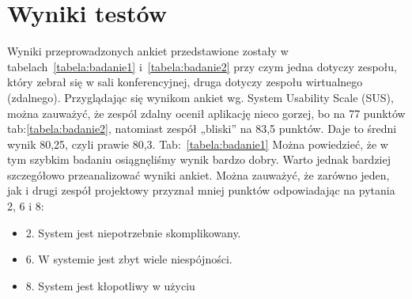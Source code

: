 \section{Wyniki testów}
Wyniki przeprowadzonych ankiet przedstawione zostały w tabelach~\ref{tabela:badanie1} i~\ref{tabela:badanie2} przy czym jedna dotyczy zespołu,
który zebrał się w sali konferencyjnej, druga dotyczy zespołu wirtualnego (zdalnego).
Przyglądając się wynikom ankiet wg. System Usability Scale (SUS), można zauważyć, że zespól zdalny
ocenił aplikację nieco gorzej, bo na 77 punktów tab:\ref{tabela:badanie2}, natomiast zespół „bliski” na 83,5 punktów. Daje to
średni wynik 80,25, czyli prawie 80,3. Tab:~\ref{tabela:badanie1}
Można powiedzieć, że w tym szybkim badaniu osiągnęliśmy wynik bardzo dobry. Warto jednak
bardziej szczegółowo przeanalizować wyniki ankiet. Można zauważyć, że zarówno jeden, jak i drugi
zespół projektowy przyznał mniej punktów odpowiadając na pytania 2, 6 i 8:
\begin{itemize}
    \item 2. System jest niepotrzebnie skomplikowany.
    \item 6. W systemie jest zbyt wiele niespójności.
    \item 8. System jest kłopotliwy w użyciu
\end{itemize}
